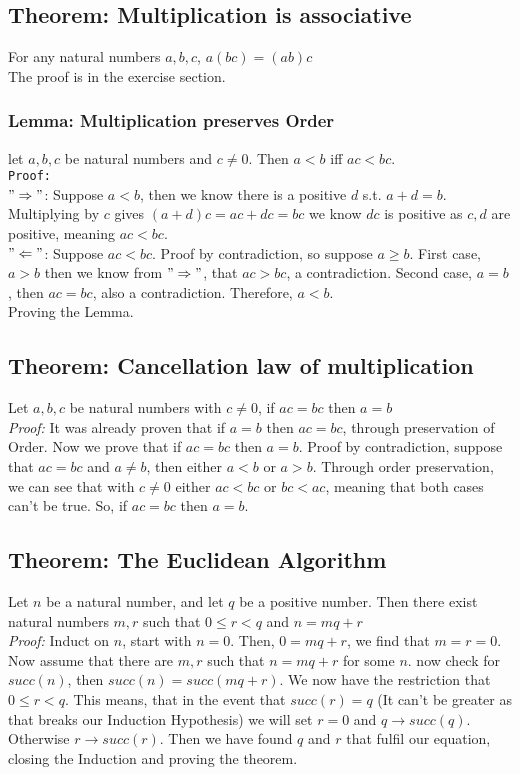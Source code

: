 \documentclass[]{scrbook}
\begin{document}
\subsection{Theorem: Multiplication is associative}
For any natural numbers $a,b,c$, $a(bc) = (ab)c$\\
The proof is in the exercise section.

\subsubsection*{Lemma: Multiplication preserves Order}
let $a,b,c$ be natural numbers and $c\neq 0$. Then $a < b$ iff $ac < bc$.\\
\texttt{Proof:}\\
$"\Rightarrow"$: Suppose $a < b$, then we know there is a positive $d$ s.t. $a + d = b$. Multiplying by $c$ gives $(a+d)c = ac + dc = bc$ we know $dc$ is positive as $c,d$ are positive, meaning $ac < bc$.\\
$"\Leftarrow"$: Suppose $ac < bc$. Proof by contradiction, so suppose $a \geqslant b$. First case, $a > b$ then we know from $"\Rightarrow"$, that $ac > bc$, a contradiction. Second case, $a = b$, then $ac = bc$, also a contradiction. Therefore, $a < b$.\\
Proving the Lemma.

\subsection{Theorem: Cancellation law of multiplication}
Let $a,b,c$ be natural numbers with $c\neq0$, if $ac = bc$ then $a = b$\\
\textit{Proof:} It was already proven that if $a = b$ then $ac = bc$, through preservation of Order. Now we prove that if $ac = bc$ then $a = b$. Proof by contradiction, suppose that $ac = bc$ and $a\neq  b$, then either $a < b$ or $a >b$. Through order preservation, we can see that with $c\neq 0$ either $ac < bc$ or $bc < ac$, meaning that both cases can't be true. So, if $ac = bc$ then $a = b$.

\subsection{Theorem: The Euclidean Algorithm}
Let $n$ be a natural number, and let $q$ be a positive number. Then there exist natural numbers $m, r$ such that $0 \leqslant r < q$ and $n = mq + r$\\
\textit{Proof:} Induct on $n$, start with $n=0$. Then, $ 0 = mq + r$, we find that $m = r = 0$. Now assume that there are $m,r$ such that $n = mq + r$ for some $n$. now check for $succ(n)$, then $succ(n) = succ(mq + r)$. We now have the restriction that $0 \leqslant r < q$. This means, that in the event that $succ(r) = q$ (It can't be greater as that breaks our Induction Hypothesis) we will set $r=0$ and $q\rightarrow succ(q)$. Otherwise $r\rightarrow succ(r)$. Then we have found $q$ and $r$ that fulfil our equation, closing the Induction and proving the theorem.
\end{document}

